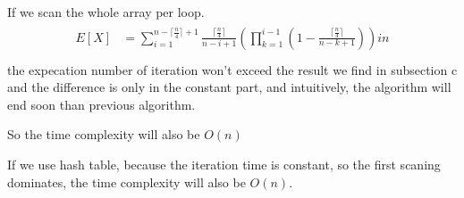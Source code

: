 \documentclass[oneside]{homework} %
\begin{document}
If we scan the whole array per loop.
\begin{eqnarray}
  \begin{split}
	E[X] &=  \sum_{i=1}^{n - \lceil \frac{n}{4} \rceil + 1}\frac{\lceil \frac{n}{4} \rceil}{n-i+1} (\prod_{k=1}^{i-1}(1- \frac{\lceil \frac{n}{4} \rceil}{n-k+1}))in \\
  \end{split}
  \label{equ:2st}
\end{eqnarray}
the expecation number of iteration won't exceed the result we find in subsection c and the difference is only in the constant part, and intuitively, the algorithm will end soon than previous algorithm.

So the time complexity will also be $O(n)$ 

If we use hash table, because the iteration time is constant, so the first scaning dominates, the time complexity will also be $O(n)$.
\end{document}
